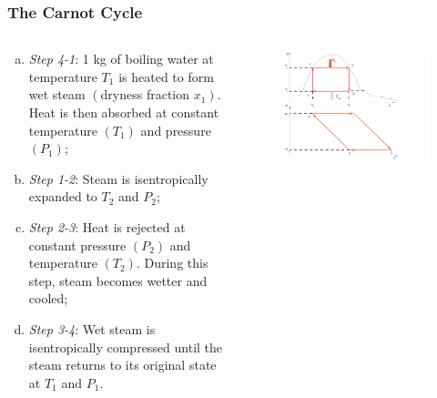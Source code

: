 \documentclass[10pt,compress]{beamer}
\begin{document}
\begin{frame}
 \frametitle{The Carnot Cycle}
  \begin{columns}
   \begin{column}[c]{0.5\linewidth}
     \begin{enumerate}[(a)]
      \item <1-> {\it Step 4-1}: 1 kg of boiling water at temperature $T_{1}$ is heated to form wet steam $\left(\right.$dryness fraction $x_{1}\left.\right)$. Heat is then absorbed at constant temperature $\left(T_{1}\right)$ and pressure $\left(P_{1}\right)$;
      \item <2-> {\it Step 1-2}: Steam is isentropically expanded to $T_{2}$ and $P_{2}$;
      \item <3-> {\it Step 2-3}: Heat is rejected at constant pressure $\left(P_{2}\right)$ and temperature $\left(T_{2}\right)$. During this step, steam becomes wetter and cooled;
      \item <4-> {\it Step 3-4}: Wet steam is isentropically compressed until the steam returns to its original state at $T_{1}$ and $P_{1}$.
     \end{enumerate}

   \end{column}
   \begin{column}[c]{0.5\linewidth}
   \begin{figure}%
    \begin{center}
     \includegraphics[width=8.cm,clip]{./Pics/Carnot_PV_TS}
    \end{center}
   \end{figure}    

   \end{column}
  \end{columns}
 \normalsize
\end{frame}
\end{document}
